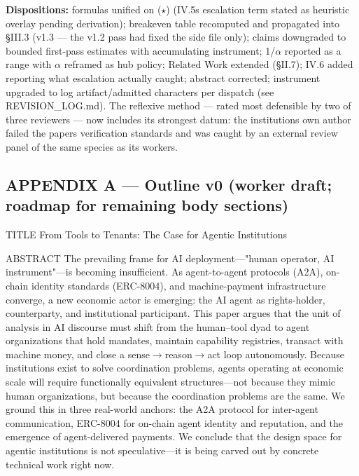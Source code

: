 \documentclass[
]{article}
\begin{document}
\textbf{Dispositions:} formulas unified on ($\star$) (IV.5\textquotesingle s
escalation term stated as heuristic overlay pending derivation);
breakeven table recomputed and propagated into \S{}III.3 (v1.3 --- the v1.2
pass had fixed the side file only); claims downgraded to bounded
first-pass estimates with accumulating instrument; 1/$\alpha$ reported as a
range with $\alpha$ reframed as hub policy; Related Work extended (\S{}II.7); IV.6
added reporting what escalation actually caught; abstract corrected;
instrument upgraded to log artifact/admitted characters per dispatch
(see REVISION\_LOG.md). The reflexive method --- rated most defensible
by two of three reviewers --- now includes its strongest datum: the
institution\textquotesingle s own author failed the
paper\textquotesingle s verification standards and was caught by an
external review panel of the same species as its workers.

\subsection{APPENDIX A --- Outline v0 (worker draft; roadmap for
remaining body
sections)}\label{appendix-a--outline-v0-worker-draft-roadmap-for-remaining-body-sections}

TITLE From Tools to Tenants: The Case for Agentic Institutions

ABSTRACT The prevailing frame for AI deployment---"human operator, AI
instrument"---is becoming insufficient. As agent-to-agent protocols
(A2A), on-chain identity standards (ERC-8004), and machine-payment
infrastructure converge, a new economic actor is emerging: the AI agent
as rights-holder, counterparty, and institutional participant. This
paper argues that the unit of analysis in AI discourse must shift from
the human--tool dyad to agent organizations that hold mandates, maintain
capability registries, transact with machine money, and close a
sense$\rightarrow$reason$\rightarrow$act loop autonomously. Because institutions exist to solve
coordination problems, agents operating at economic scale will require
functionally equivalent structures---not because they mimic human
organizations, but because the coordination problems are the same. We
ground this in three real-world anchors: the A2A protocol for
inter-agent communication, ERC-8004 for on-chain agent identity and
reputation, and the emergence of agent-delivered payments. We conclude
that the design space for agentic institutions is not speculative---it
is being carved out by concrete technical work right now.
\end{document}
